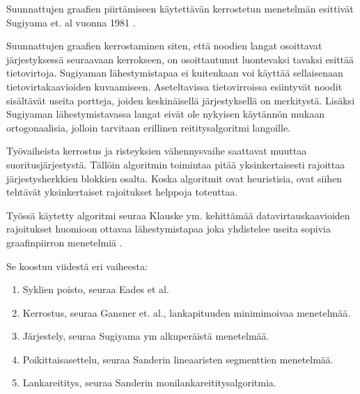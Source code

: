 \documentclass[finnish,12pt]{article}
\begin{document}

Suunnattujen graafien piirtämiseen käytettävän kerrostetun menetelmän
esittivät Sugiyama et. al vuonna 1981 \cite{RefWorks:9}.

Suunnattujen graafien kerrostaminen siten, että noodien langat osoittavat järjestyksessä seuraavaan kerrokseen,
on osoittautunut luontevaksi tavaksi esittää tietovirtoja. Sugiyaman lähestymistapaa ei kuitenkaan voi käyttää sellaisenaan tietovirtakaavioiden kuvaamiseen. Aseteltavissa tietovirroissa esiintyvät noodit sisältävät useita portteja, joiden keskinäisellä järjestyksellä on merkitystä. Lisäksi Sugiyaman lähestymistavassa langat eivät ole nykyisen käytännön mukaan ortogonaalisia, jolloin tarvitaan erillinen reititysalgoritmi langoille.

Työvaiheista kerrostus ja risteyksien vähennysvaihe saattavat muuttaa suoritusjärjestystä.
Tällöin algoritmin toimintaa pitää yksinkertaisesti rajoittaa järjestysherkkien blokkien osalta.
Koska algoritmit ovat heuristisia, ovat siihen tehtävät yksinkertaiset rajoitukset helppoja toteuttaa.



Työssä käytetty algoritmi seuraa Klauske ym. kehittämää datavirtauskaavioiden rajoitukset huomioon ottavaa lähestymistapaa joka yhdistelee useita sopivia graafinpiirron menetelmiä \cite{RefWorks:50}.

Se koostuu viidestä eri vaiheesta:
\begin{enumerate}
  \item Syklien poisto, seuraa Eades et al.\cite{RefWorks:48}
  \item Kerrostus, seuraa Gansner et. al., lankapituuden minimimoivaa menetelmää. \cite{RefWorks:28}
  \item Järjestely, seuraa Sugiyama ym alkuperäistä menetelmää. \cite{RefWorks:9}
  \item Poikittaisasettelu, seuraa Sanderin lineaaristen segmenttien menetelmää. \cite{RefWorks:49}
  \item Lankareititys, seuraa Sanderin monilankareititysalgoritmia. \cite{RefWorks:17}
\end{enumerate}
\end{document}
